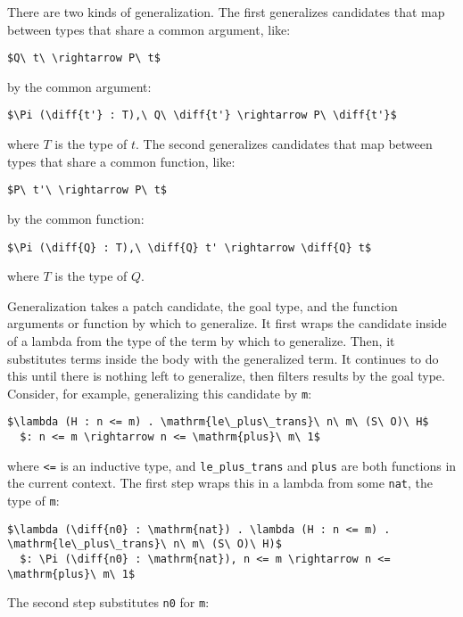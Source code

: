 There are two kinds of generalization.
The first generalizes candidates that map between types that share a common argument, like: %

\begin{lstlisting}[language=coq]
  $Q\ t\ \rightarrow P\ t$
\end{lstlisting}
by the common argument:

\begin{lstlisting}[language=coq]
  $\Pi (\diff{t'} : T),\ Q\ \diff{t'} \rightarrow P\ \diff{t'}$
\end{lstlisting}
where $T$ is the type of $t$.
The second generalizes candidates that map between types that share a common function, like:

\begin{lstlisting}[language=coq]
  $P\ t'\ \rightarrow P\ t$
\end{lstlisting}
by the common function:

\begin{lstlisting}[language=coq]
  $\Pi (\diff{Q} : T),\ \diff{Q} t' \rightarrow \diff{Q} t$
\end{lstlisting}
where $T$ is the type of $Q$.

Generalization takes a patch candidate, the goal type, and the function arguments or function by which to generalize.
It first wraps the candidate inside of a lambda from the type of the term by which to generalize.
Then, it substitutes terms inside the body with the generalized term.
It continues to do this until there is nothing left to generalize, then filters results by the goal type.
Consider, for example, generalizing this candidate by \lstinline{m}: %

\begin{lstlisting}[language=coq]
  $\lambda (H : n <= m) . \mathrm{le\_plus\_trans}\ n\ m\ (S\ O)\ H$
  $: n <= m \rightarrow n <= \mathrm{plus}\ m\ 1$
\end{lstlisting}
where \lstinline{<=} is an inductive type, and \lstinline{le_plus_trans} and \lstinline{plus} are both functions in the current context.
The first step wraps this in a lambda from some \lstinline{nat}, the type of \lstinline{m}:

\begin{lstlisting}[language=coq]
  $\lambda (\diff{n0} : \mathrm{nat}) . \lambda (H : n <= m) . \mathrm{le\_plus\_trans}\ n\ m\ (S\ O)\ H)$
  $: \Pi (\diff{n0} : \mathrm{nat}), n <= m \rightarrow n <= \mathrm{plus}\ m\ 1$
\end{lstlisting}
The second step substitutes \lstinline{n0} for \lstinline{m}:

